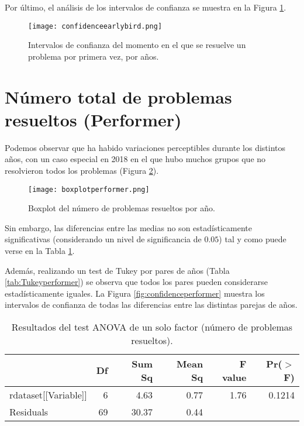 Por último, el análisis de los intervalos de confianza se muestra en la Figura \ref{fig:confidenceearlybird}.

\begin{figure}[H]
    \centering
    \texttt{[image: confidenceearlybird.png]}
    \caption{Intervalos de confianza del momento en el que se resuelve un problema por primera vez, por años.}
    \label{fig:confidenceearlybird}
\end{figure}

\section{Número total de problemas resueltos (Performer)}

Podemos observar que ha habido variaciones perceptibles durante los distintos años, con un caso especial en 2018 en el que hubo muchos grupos que no resolvieron todos los problemas (Figura \ref{fig:boxplotperformer}).

\begin{figure}[H]
    \centering
    \texttt{[image: boxplotperformer.png]}
    \caption{Boxplot del número de problemas resueltos por año.}
    \label{fig:boxplotperformer}
\end{figure}

Sin embargo, las diferencias entre las medias no son estadísticamente significativas (considerando un nivel de significancia de $0.05$) tal y como puede verse en la Tabla \ref{tab:ANOVAperformer}.

Además, realizando un test de Tukey por pares de años (Tabla \ref{tab:Tukeyperformer}) se observa que todos los pares pueden considerarse estadísticamente iguales. La Figura \ref{fig:confidenceperformer} muestra los intervalos de confianza de todas las diferencias entre las distintas parejas de años.

\begin{table}[H]
\centering
\caption{Resultados del test ANOVA de un solo factor (número de problemas resueltos).}
\label{tab:ANOVAperformer}
\begin{tabular}{lrrrrr}
  \hline
 & Df & Sum Sq & Mean Sq & F value & Pr($>$F) \\ 
  \hline
rdataset[[Variable]] & 6 & 4.63 & 0.77 & 1.76 & 0.1214 \\ 
  Residuals            & 69 & 30.37 & 0.44 &  &  \\ 
   \hline
\end{tabular}
\end{table}

